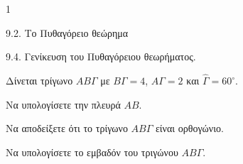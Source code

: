 \begin{ylh}{1}
    \item 9.2. Το Πυθαγόρειο θεώρημα
    \item 9.4. Γενίκευση του Πυθαγόρειου θεωρήματος.
\end{ylh}
\begin{figure}
\end{figure}
Δίνεται τρίγωνο $AB\Gamma$ με $B\Gamma = 4$, $A\Gamma = 2$ και $\hat{\Gamma} = 60^\circ$.
\begin{alist}
\item Να υπολογίσετε την πλευρά $AB$. 
\item Να αποδείξετε ότι το τρίγωνο $AB\Gamma$ είναι ορθογώνιο. 
\item Να υπολογίσετε το εμβαδόν του τριγώνου $AB\Gamma$. 
\end{alist}